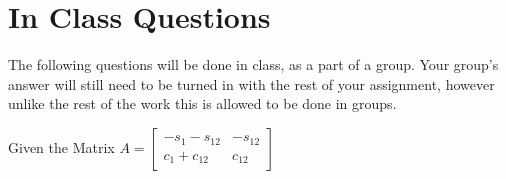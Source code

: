\documentclass{16384_doc}
\begin{document}
\section{In Class Questions}

    The following questions will be done in class, as a part of a group. Your group's answer will still need to be turned in with the rest of your assignment, however unlike the rest of the work this is allowed to be done in groups.
    
    \begin{questions}
    Given the Matrix
    $ A = \begin{bmatrix}
    -s_1- s_{12}& - s_{12} \\
    c_1 + c_{12}& c_{12}
    \end{bmatrix} $

\end{questions}
\end{document}

